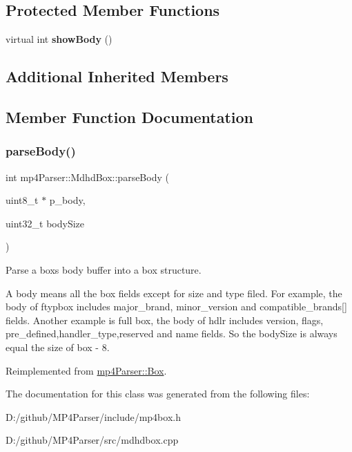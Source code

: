 \subsection*{Protected Member Functions}
\begin{DoxyCompactItemize}
\item 
\mbox{\label{classmp4_parser_1_1_mdhd_box_a883670b5c4d9532adb1ea193c5b80013}} 
virtual int {\bfseries show\+Body} ()
\end{DoxyCompactItemize}
\subsection*{Additional Inherited Members}


\subsection{Member Function Documentation}
\mbox{\label{classmp4_parser_1_1_mdhd_box_a8168bb0096c340422ad97250aff16528}} 
\subsubsection{\texorpdfstring{parseBody()}{parseBody()}}
{\footnotesize\ttfamily int mp4\+Parser\+::\+Mdhd\+Box\+::parse\+Body (\begin{DoxyParamCaption}\item[{uint8\+\_\+t $\ast$}]{p\+\_\+body,  }\item[{uint32\+\_\+t}]{body\+Size }\end{DoxyParamCaption})\hspace{0.3cm}{\ttfamily [virtual]}}



Parse a box\textquotesingle{}s body buffer into a box structure. 

A body means all the box fields except for size and type filed. For example, the body of ftypbox includes major\+\_\+brand, minor\+\_\+version and compatible\+\_\+brands\mbox{[}\mbox{]} fields. Another example is full box, the body of hdlr includes version, flags, pre\+\_\+defined,handler\+\_\+type,reserved and name fields. So the body\+Size is always equal the size of box -\/ 8. 

Reimplemented from \mbox{\hyperlink{classmp4_parser_1_1_box_a3dd0c084ac65bc77b69ac5ecaf796cb2}{mp4\+Parser\+::\+Box}}.



The documentation for this class was generated from the following files\+:\begin{DoxyCompactItemize}
\item 
D\+:/github/\+M\+P4\+Parser/include/mp4box.\+h\item 
D\+:/github/\+M\+P4\+Parser/src/mdhdbox.\+cpp\end{DoxyCompactItemize}
